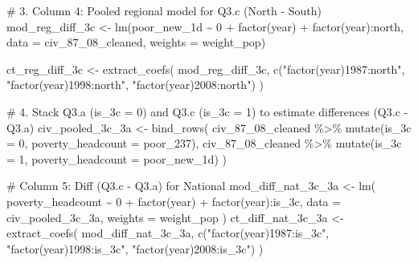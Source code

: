 \documentclass[
  letterpaper,
  DIV=11,
  numbers=noendperiod]{scrartcl}
\newenvironment{Shaded}{\begin{snugshade}}{\end{snugshade}}
\newcommand{\AttributeTok}[1]{\textcolor[rgb]{0.40,0.45,0.13}{#1}}
\newcommand{\CommentTok}[1]{\textcolor[rgb]{0.37,0.37,0.37}{#1}}
\newcommand{\DecValTok}[1]{\textcolor[rgb]{0.68,0.00,0.00}{#1}}
\newcommand{\FunctionTok}[1]{\textcolor[rgb]{0.28,0.35,0.67}{#1}}
\newcommand{\NormalTok}[1]{\textcolor[rgb]{0.00,0.23,0.31}{#1}}
\newcommand{\OtherTok}[1]{\textcolor[rgb]{0.00,0.23,0.31}{#1}}
\newcommand{\SpecialCharTok}[1]{\textcolor[rgb]{0.37,0.37,0.37}{#1}}
\newcommand{\StringTok}[1]{\textcolor[rgb]{0.13,0.47,0.30}{#1}}
\begin{document}
\begin{Shaded}
\begin{Highlighting}[]
\CommentTok{\# 3. Column 4: Pooled regional model for Q3.c (North {-} South)}
\NormalTok{mod\_reg\_diff\_3c }\OtherTok{\textless{}{-}} \FunctionTok{lm}\NormalTok{(poor\_new\_1d }\SpecialCharTok{\textasciitilde{}} \DecValTok{0} \SpecialCharTok{+} \FunctionTok{factor}\NormalTok{(year) }\SpecialCharTok{+} \FunctionTok{factor}\NormalTok{(year)}\SpecialCharTok{:}\NormalTok{north,}
                      \AttributeTok{data =}\NormalTok{ civ\_87\_08\_cleaned, }\AttributeTok{weights =}\NormalTok{ weight\_pop)}

\NormalTok{ct\_reg\_diff\_3c }\OtherTok{\textless{}{-}} \FunctionTok{extract\_coefs}\NormalTok{(}
\NormalTok{  mod\_reg\_diff\_3c,}
  \FunctionTok{c}\NormalTok{(}\StringTok{"factor(year)1987:north"}\NormalTok{, }\StringTok{"factor(year)1998:north"}\NormalTok{, }\StringTok{"factor(year)2008:north"}\NormalTok{)}
\NormalTok{)}

\CommentTok{\# 4. Stack Q3.a (is\_3c = 0) and Q3.c (is\_3c = 1) to estimate differences (Q3.c {-} Q3.a)}
\NormalTok{civ\_pooled\_3c\_3a }\OtherTok{\textless{}{-}} \FunctionTok{bind\_rows}\NormalTok{(}
\NormalTok{  civ\_87\_08\_cleaned }\SpecialCharTok{\%\textgreater{}\%} \FunctionTok{mutate}\NormalTok{(}\AttributeTok{is\_3c =} \DecValTok{0}\NormalTok{, }\AttributeTok{poverty\_headcount =}\NormalTok{ poor\_237),}
\NormalTok{  civ\_87\_08\_cleaned }\SpecialCharTok{\%\textgreater{}\%} \FunctionTok{mutate}\NormalTok{(}\AttributeTok{is\_3c =} \DecValTok{1}\NormalTok{, }\AttributeTok{poverty\_headcount =}\NormalTok{ poor\_new\_1d)}
\NormalTok{)}

\CommentTok{\# Column 5: Diff (Q3.c {-} Q3.a) for National}
\NormalTok{mod\_diff\_nat\_3c\_3a }\OtherTok{\textless{}{-}} \FunctionTok{lm}\NormalTok{(}
\NormalTok{  poverty\_headcount }\SpecialCharTok{\textasciitilde{}} \DecValTok{0} \SpecialCharTok{+} \FunctionTok{factor}\NormalTok{(year) }\SpecialCharTok{+} \FunctionTok{factor}\NormalTok{(year)}\SpecialCharTok{:}\NormalTok{is\_3c,}
  \AttributeTok{data =}\NormalTok{ civ\_pooled\_3c\_3a, }\AttributeTok{weights =}\NormalTok{ weight\_pop}
\NormalTok{)}
\NormalTok{ct\_diff\_nat\_3c\_3a }\OtherTok{\textless{}{-}} \FunctionTok{extract\_coefs}\NormalTok{(}
\NormalTok{  mod\_diff\_nat\_3c\_3a,}
  \FunctionTok{c}\NormalTok{(}\StringTok{"factor(year)1987:is\_3c"}\NormalTok{, }\StringTok{"factor(year)1998:is\_3c"}\NormalTok{, }\StringTok{"factor(year)2008:is\_3c"}\NormalTok{)}
\NormalTok{)}


\end{Highlighting}
\end{Shaded}
\end{document}
